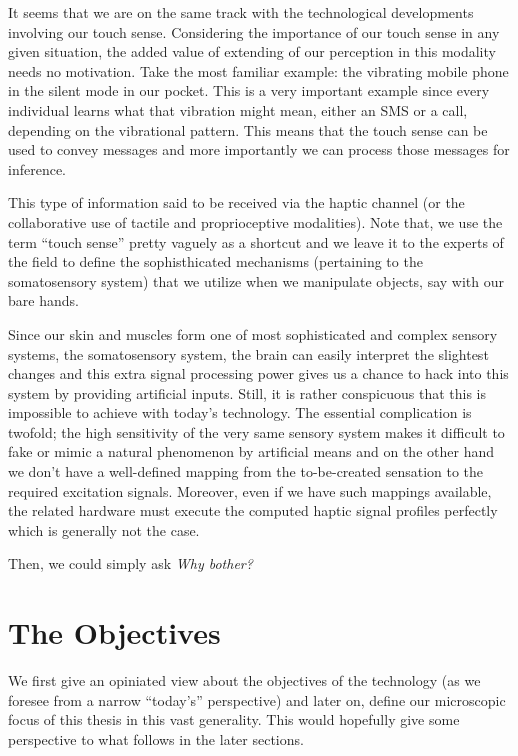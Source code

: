 It seems that we are on the same track with the technological developments involving our touch sense. Considering the importance of our touch sense in any given situation, the added value of extending of our perception in this modality needs no motivation. Take the most familiar example: the vibrating mobile phone in the silent mode in our pocket. This is a very important example since every individual learns what that vibration might mean, either an SMS or a call, depending on the vibrational pattern. This means that the touch sense can be used to convey messages and more importantly we can process those messages for inference. 


This type of information said to be received via the haptic channel (or the collaborative use of tactile and proprioceptive modalities). Note that, we use the term ``touch sense'' pretty vaguely as a shortcut and we leave it to the experts of the field to define the sophisthicated mechanisms (pertaining to the somatosensory system) that we utilize when we manipulate objects, say with our bare hands. 


Since our skin and muscles form one of most sophisticated and complex sensory systems, the somatosensory system, the brain can easily interpret the slightest changes and this extra signal processing power gives us a chance to hack into this system by providing artificial inputs. Still, it is rather conspicuous that this is impossible to achieve with today's technology. The essential complication is twofold; the high sensitivity of the very same sensory system makes it difficult to fake or mimic a natural phenomenon by artificial means and on the other hand we don't have a well-defined mapping from the to-be-created sensation to the required excitation signals. Moreover, even if we have such mappings available, the related hardware must execute the computed haptic signal profiles perfectly which is generally not the case.

Then, we could simply ask \emph{Why bother?} 


\section{The Objectives}

We first give an opiniated view about the objectives of the technology (as we foresee from a narrow ``today's'' perspective) and later on, define our microscopic focus of this thesis in this vast generality. This would hopefully give some perspective to what follows in the later sections.  


